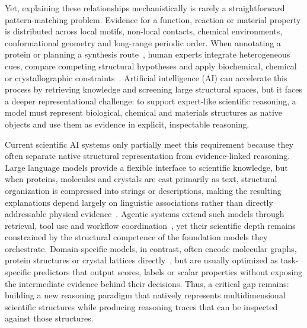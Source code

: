 Yet, explaining these relationships mechanistically is rarely a straightforward pattern-matching problem. Evidence for a function, reaction or material property is distributed across local motifs, non-local contacts, chemical environments, conformational geometry and long-range periodic order. When annotating a protein or planning a synthesis route~\citep{strieth2024artificial,segler2018planning}, human experts integrate heterogeneous cues, compare competing structural hypotheses and apply biochemical, chemical or crystallographic constraints~\citep{duek2021functionathon,zhao2024efficient}. Artificial intelligence (AI) can accelerate this process by retrieving knowledge and screening large structural spaces, but it faces a deeper representational challenge: to support expert-like scientific reasoning, a model must represent biological, chemical and materials structures as native objects and use them as evidence in explicit, inspectable reasoning.


Current scientific AI systems only partially meet this requirement because they often separate native structural representation from evidence-linked reasoning. Large language models provide a flexible interface to scientific knowledge, but when proteins, molecules and crystals are cast primarily as text, structural organization is compressed into strings or descriptions, making the resulting explanations depend largely on linguistic associations rather than directly addressable physical evidence~\citep{achiam2023gpt,mirza2025superhuman,narayanan2026ether0}. Agentic systems extend such models through retrieval, tool use and workflow coordination~\citep{boiko2023autonomous,ghareeb2026multi,aygun2026ai,gottweis2026accelerating}, yet their scientific depth remains constrained by the structural competence of the foundation models they orchestrate. Domain-specific models, in contrast, often encode molecular graphs, protein structures or crystal lattices directly~\citep{wang2023scientific,xie2018crystal,yang2019analyzing}, but are usually optimized as task-specific predictors that output scores, labels or scalar properties without exposing the intermediate evidence behind their decisions. Thus, a critical gap remains: building a new reasoning paradigm that natively represents multidimensional scientific structures while producing reasoning traces that can be inspected against those structures.


